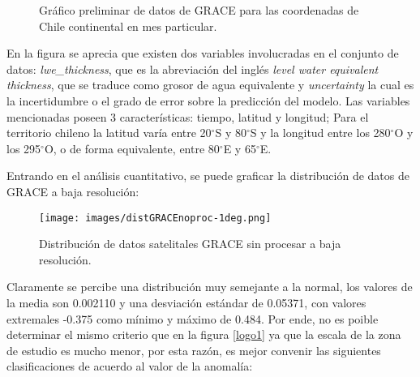     \begin{figure}[ht]
        \centering
              \goodgap
              \vskip -0.1in
        \caption[Rutina para extracción de datos GRACE]{Gráfico preliminar de datos de GRACE para las coordenadas de Chile continental en mes particular.}
        \label{logo}
    \end{figure}

    En la figura se aprecia que existen dos variables involucradas en el conjunto de datos: \textit{lwe\_thickness}, que es la abreviación del inglés
    \textit{level water equivalent thickness}, que se traduce como grosor de agua equivalente y \textit{uncertainty} la cual es la incertidumbre
    o el grado de error sobre la predicción del modelo. Las variables mencionadas poseen 3 características: tiempo, latitud y longitud; Para el territorio 
    chileno la latitud varía entre 20$^{\circ}$S y 80$^{\circ}$S y la longitud entre los 280$^{\circ}$O y los 295$^{\circ}$O, o de forma equivalente, entre 
    80$^{\circ}$E y 65$^{\circ}$E.

    Entrando en el análisis cuantitativo, se puede graficar la distribución de datos de GRACE a baja resolución:
    \begin{figure}[h]
        \centering
              \texttt{[image: images/distGRACEnoproc-1deg.png]}
        \caption[Distribución de datos satelitales a baja resolución]{\footnotesize Distribución de datos satelitales GRACE sin procesar a baja resolución.}
    \end{figure}
    
    Claramente se percibe una distribución muy semejante a la normal, los valores de la media son 0.002110 y una desviación estándar de 0.05371, con valores extremales -0.375 como mínimo y 
    máximo de 0.484. Por ende, no es poible determinar el mismo criterio que en la figura \ref{logo1} ya que la escala de la zona de estudio es mucho menor, por esta razón, es mejor convenir las siguientes clasificaciones
    de acuerdo al valor de la anomalía:

